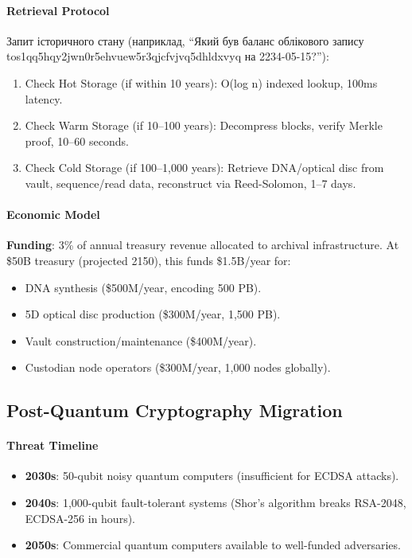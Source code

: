\documentclass[11pt]{article}
\begin{document}
\paragraph{Retrieval Protocol}
Запит історичного стану (наприклад, ``Який був баланс облікового запису tos1qq5hqy2jwn0r5ehvuew5r3qjcfvjvq5dhldxvyq на 2234-05-15?''):
\begin{enumerate}[noitemsep]
  \item Check Hot Storage (if within 10 years): O(log n) indexed lookup, 100ms latency.
  \item Check Warm Storage (if 10--100 years): Decompress blocks, verify Merkle proof, 10--60 seconds.
  \item Check Cold Storage (if 100--1,000 years): Retrieve DNA/optical disc from vault, sequence/read data, reconstruct via Reed-Solomon, 1--7 days.
\end{enumerate}

\paragraph{Economic Model}
\textbf{Funding}: 3\% of annual treasury revenue allocated to archival infrastructure. At \$50B treasury (projected 2150), this funds \$1.5B/year for:
\begin{itemize}[noitemsep]
  \item DNA synthesis (\$500M/year, encoding 500 PB).
  \item 5D optical disc production (\$300M/year, 1,500 PB).
  \item Vault construction/maintenance (\$400M/year).
  \item Custodian node operators (\$300M/year, 1,000 nodes globally).
\end{itemize}

\subsection{Post-Quantum Cryptography Migration}

\paragraph{Threat Timeline}
\begin{itemize}[noitemsep]
  \item \textbf{2030s}: 50-qubit noisy quantum computers (insufficient for ECDSA attacks).
  \item \textbf{2040s}: 1,000-qubit fault-tolerant systems (Shor's algorithm breaks RSA-2048, ECDSA-256 in hours).
  \item \textbf{2050s}: Commercial quantum computers available to well-funded adversaries.
\end{itemize}
\end{document}

